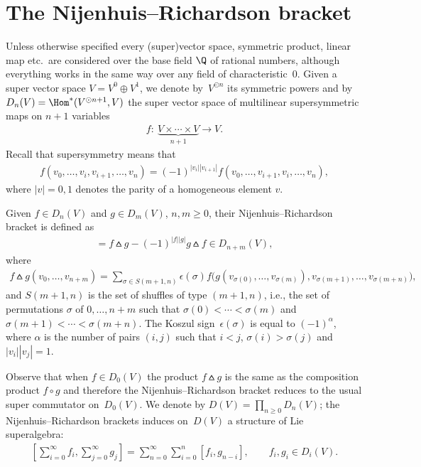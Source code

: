 \section{The Nijenhuis--Richardson bracket}\label{sec.NR}

Unless otherwise specif\/ied every (super)vector space, symmetric product, linear map etc.\ are considered over the base f\/ield $\Q$ of rational numbers, although everything works in the same way over any f\/ield of characteristic~0.
Given a super vector space $V=V^{0}\oplus V^{1}$, we denote by~$V^{\odot n}$ its symmetric powers and by
$D_{n}(V)=\Hom^*(V^{\odot n+1},V)$ the super vector space of multilinear supersymmetric maps on $n+1$ variables
\begin{gather*} f\colon \ \underbrace{V\times\cdots\times V}_{n+1}\to V. \end{gather*}
Recall that supersymmetry means that
\begin{gather*} f(v_0,\ldots,v_i,v_{i+1},\ldots,v_n)=(-1)^{|v_i||v_{i+1}|}f(v_0,\ldots,v_{i+1},v_{i},\ldots,v_n),\end{gather*}
where $|v|=0,1$ denotes the parity of a homogeneous element $v$.

Given $f\in D_n(V)$ and $g\in D_m(V)$, $n,m\ge 0$, their Nijenhuis--Richardson bracket \cite{NijRich67} is def\/ined as
\begin{gather*} [f,g]=f\wedgebar g-(-1)^{|f||g|}g\wedgebar f \in D_{n+m}(V),\end{gather*}
where
\begin{gather*} f\wedgebar g
(v_{0},\ldots, v_{n+m})= \sum_{\sigma\in S(m+1,n)}\epsilon(\sigma)
f\big(g(v_{\sigma(0)},\ldots, v_{\sigma(m)}), v_{\sigma(m+1)},\ldots,
v_{\sigma(m+n)}\big),\end{gather*}
and $S(m+1,n)$ is the set of shuf\/f\/les of type $(m+1,n)$, i.e., the set of permutations $\sigma$ of $0,\ldots,n+m$
such that $\sigma(0)<\cdots<\sigma(m)$ and $\sigma(m+1)<\cdots<\sigma(m+n)$. The Koszul sign~$\epsilon(\sigma)$ is equal to $(-1)^{\alpha}$, where $\alpha$ is the number of pairs $(i,j)$ such that $i<j$, $\sigma(i)>\sigma(j)$ and $|v_i||v_j|=1$.

Observe that when $f\in D_0(V)$ the product $f\wedgebar g$ is the same as the composition product $f\circ g$ and therefore
the Nijenhuis--Richardson bracket reduces to the usual super commutator on~$D_0(V)$. We denote by $D(V)=\prod\limits_{n\ge 0}D_n(V)$; the Nijenhuis--Richardson brackets induces on~$D(V)$ a structure of Lie superalgebra:
\begin{gather*} \left[\sum_{i=0}^{\infty}f_i ,\sum_{j= 0}^{\infty}g_j\right]=\sum_{n= 0}^{\infty} \sum_{i=0}^n [f_i,g_{n-i}],\qquad f_i,g_i\in D_i(V) .\end{gather*}

